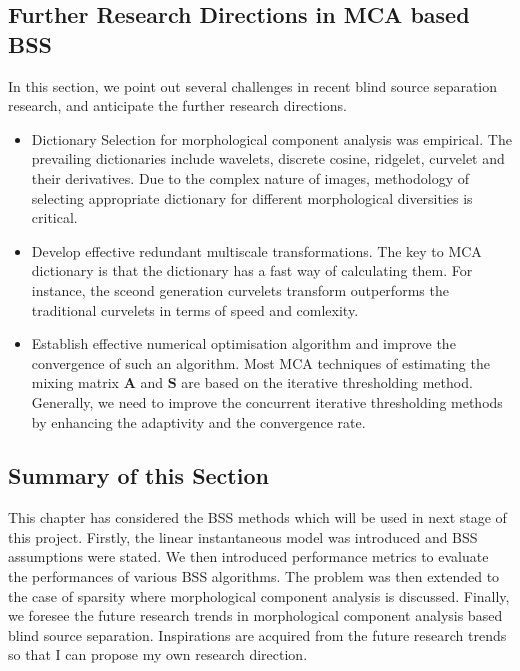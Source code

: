 \subsection{Further Research Directions in MCA based BSS}
In this section, we point out several challenges in recent blind source separation research, and anticipate the further research directions.\\
\begin{itemize}
    \item Dictionary Selection for morphological component analysis was empirical. The prevailing dictionaries include wavelets, discrete cosine, ridgelet, curvelet and their derivatives. Due to the complex nature of images, methodology of selecting appropriate dictionary for different  morphological diversities is critical.
    \item Develop effective redundant multiscale transformations. The key to MCA dictionary is that the dictionary has a fast way of calculating them. For instance, the sceond generation curvelets transform outperforms the traditional curvelets in terms of speed and comlexity.
    \item Establish effective numerical optimisation algorithm and improve the convergence of such an algorithm. Most MCA techniques of estimating the mixing matrix $\mathbf{A}$ and $\mathbf{S}$ are based on the iterative thresholding method. Generally, we need to improve the concurrent iterative thresholding methods by enhancing the adaptivity and the convergence rate.
\end{itemize}


\subsection{Summary of this Section}
This chapter has considered the BSS methods which will be used in next stage of this project. Firstly, the linear instantaneous model was introduced and BSS assumptions were stated. We then introduced performance metrics to evaluate the performances of various BSS algorithms. The problem was then extended to the case of sparsity where morphological component analysis is discussed. Finally, we foresee the future research trends in morphological component analysis based blind source separation. Inspirations are acquired from the future research trends so that I can propose my own research direction.